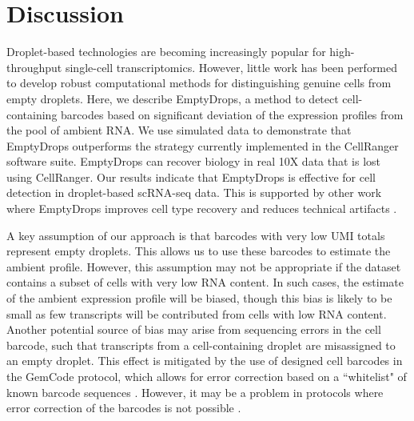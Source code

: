 \documentclass[10pt,letterpaper]{article}
\begin{document}
\section*{Discussion}
Droplet-based technologies are becoming increasingly popular for high-throughput single-cell transcriptomics.
However, little work has been performed to develop robust computational methods for distinguishing genuine cells from empty droplets.
Here, we describe EmptyDrops, a method to detect cell-containing barcodes based on significant deviation of the expression profiles from the pool of ambient RNA.
We use simulated data to demonstrate that EmptyDrops outperforms the strategy currently implemented in the CellRanger software suite.
EmptyDrops can recover biology in real 10X data that is lost using CellRanger.
Our results indicate that EmptyDrops is effective for cell detection in droplet-based scRNA-seq data.
This is supported by other work where EmptyDrops improves cell type recovery \cite{ernst2018staged} and reduces technical artifacts \cite{griffiths2018detection}.

A key assumption of our approach is that barcodes with very low UMI totals represent empty droplets.
This allows us to use these barcodes to estimate the ambient profile.
However, this assumption may not be appropriate if the dataset contains a subset of cells with very low RNA content.
In such cases, the estimate of the ambient expression profile will be biased, though this bias is likely to be small as few transcripts will be contributed from cells with low RNA content.
Another potential source of bias may arise from sequencing errors in the cell barcode, such that transcripts from a cell-containing droplet are misassigned to an empty droplet.
This effect is mitigated by the use of designed cell barcodes in the GemCode protocol, which allows for error correction based on a ``whitelist" of known barcode sequences \cite{zheng2017massively}.
However, it may be a problem in protocols where error correction of the barcodes is not possible \cite{macosko2015highly}.

\end{document}
